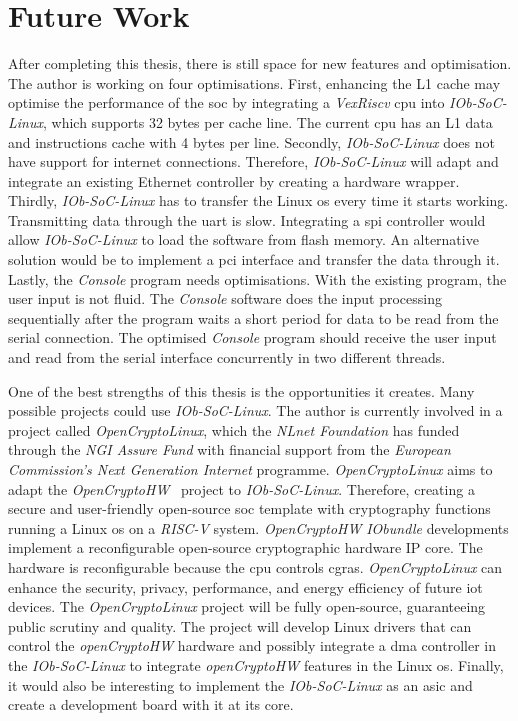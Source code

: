 \section{Future Work}
\label{section:future}
After completing this thesis, there is still space for new features and optimisation. The author is working on four optimisations. First, enhancing the L1 cache may optimise the performance of the \acrshort{soc} by integrating a \textit{VexRiscv} \acrshort{cpu} into \textit{IOb-SoC-Linux}, which supports 32 bytes per cache line. The current \acrshort{cpu} has an L1 data and instructions cache with 4 bytes per line. Secondly, \textit{IOb-SoC-Linux} does not have support for internet connections. Therefore, \textit{IOb-SoC-Linux} will adapt and integrate an existing Ethernet controller by creating a hardware wrapper. Thirdly, \textit{IOb-SoC-Linux} has to transfer the Linux \acrshort{os} every time it starts working. Transmitting data through the \acrshort{uart} is slow. Integrating a \acrfull{spi} controller would allow \textit{IOb-SoC-Linux} to load the software from flash memory. An alternative solution would be to implement a \acrshort{pci} interface and transfer the data through it. Lastly, the \textit{Console} program needs  optimisations. With the existing program, the user input is not fluid. The \textit{Console} software does the input processing sequentially after the program waits a short period for data to be read from the serial connection. The optimised \textit{Console} program should receive the user input and read from the serial interface concurrently in two different threads.

One of the best strengths of this thesis is the opportunities it creates. Many possible projects could use \textit{IOb-SoC-Linux}. The author is currently involved in a project called \textit{OpenCryptoLinux}, which the \textit{NLnet Foundation} has funded through the \textit{NGI Assure Fund} with financial support from the \textit{European Commission's Next Generation Internet} programme. \textit{OpenCryptoLinux} aims to adapt the \textit{OpenCryptoHW}~\cite{open_crypto_hw} project to \textit{IOb-SoC-Linux}. Therefore, creating a secure and user-friendly open-source \acrshort{soc} template with cryptography functions running a Linux \acrshort{os} on a \textit{RISC-V} system. \textit{OpenCryptoHW} \textit{IObundle} developments implement a reconfigurable open-source cryptographic hardware IP core. The hardware is reconfigurable because the \acrshort{cpu} controls \acrfull{cgras}. \textit{OpenCryptoLinux} can enhance the security, privacy, performance, and energy efficiency of future \acrfull{iot} devices. The \textit{OpenCryptoLinux} project will be fully open-source, guaranteeing public scrutiny and quality. The project will develop Linux drivers that can control the \textit{openCryptoHW} hardware and possibly integrate a \acrshort{dma} controller in the \textit{IOb-SoC-Linux} to integrate \textit{openCryptoHW} features in the Linux \acrshort{os}. Finally, it would also be interesting to implement the \textit{IOb-SoC-Linux} as an \acrshort{asic} and create a development board with it at its core.
